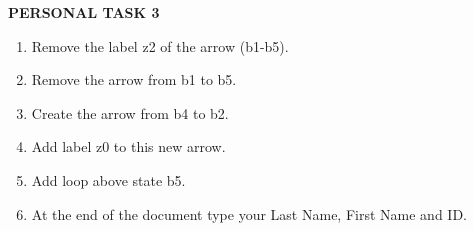 \documentclass[a4paper]{article}
\begin{document}
\vspace{1cm}

\textbf{PERSONAL TASK 3}
\bigskip
\rm

\begin{enumerate}
    \item Remove the label z2 of the arrow (b1-b5).
    \item Remove the arrow from b1 to b5.
    \item Create the arrow from b4 to b2.
    \item Add label z0 to this new arrow.
    \item Add loop above state b5.
    \item At the end of the document type your Last Name, First Name and ID.

\end{enumerate}
\end{document}
